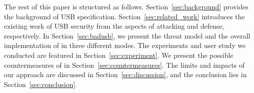 The rest of this paper is structured as follows.  Section~\ref{sec:background}
provides the background of \ac{USB} specification.  Section~\ref{sec:related_work}
introduces the existing work of \ac{USB} security from the aspects of attacking and
defense, respectively.  In Section~\ref{sec:badusb}, we present the threat model
and the overall implementation of \tool in three different modes.  The
experiments and user study we conducted are featured in
Section~\ref{sec:experiment}.  We present the possible countermeasures of \tool
in Section~\ref{sec:countermeasures}.  The limits and impacts of our approach
are discussed in Section~\ref{sec:discussion}, and the conclusion lies in
Section~\ref{sec:conclusion}.














